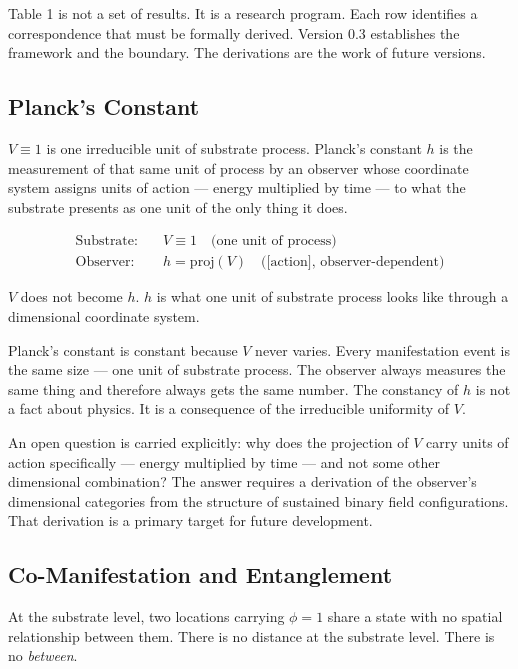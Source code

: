 \documentclass[11pt,letterpaper]{article}
\begin{document}
Table 1 is not a set of results. It is a research program. Each row identifies a correspondence that must be formally derived. Version 0.3 establishes the framework and the boundary. The derivations are the work of future versions.
\subsection{Planck's Constant}
\label{sec:orgaa5cb97}

\(V \equiv 1\) is one irreducible unit of substrate process. Planck's constant \(h\) is the measurement of that same unit of process by an observer whose coordinate system assigns units of action --- energy multiplied by time --- to what the substrate presents as one unit of the only thing it does.

\begin{align}
\text{Substrate:} &\quad V \equiv 1 \quad \text{(one unit of process)} \\
\text{Observer:}  &\quad h = \mathrm{proj}(V) \quad \text{([action], observer-dependent)}
\end{align}

\begin{center}
\(V\) does not become \(h\). \(h\) is what one unit of substrate process looks like through a dimensional coordinate system.
\end{center}

Planck's constant is constant because \(V\) never varies. Every manifestation event is the same size --- one unit of substrate process. The observer always measures the same thing and therefore always gets the same number. The constancy of \(h\) is not a fact about physics. It is a consequence of the irreducible uniformity of \(V\).

An open question is carried explicitly: why does the projection of \(V\) carry units of action specifically --- energy multiplied by time --- and not some other dimensional combination? The answer requires a derivation of the observer's dimensional categories from the structure of sustained binary field configurations. That derivation is a primary target for future development.
\subsection{Co-Manifestation and Entanglement}
\label{sec:org510da9f}

At the substrate level, two locations carrying \(\phi = 1\) share a state with no spatial relationship between them. There is no distance at the substrate level. There is no \emph{between}.
\end{document}
